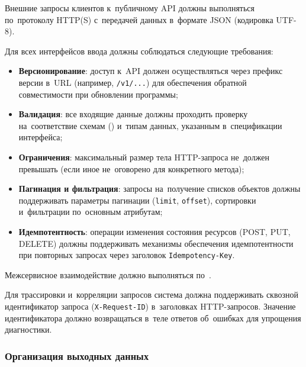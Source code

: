 \documentclass[12pt,a4paper]{extarticle}
\begin{document}
\begin{hseExample}
Внешние запросы клиентов к~публичному API должны выполняться по~протоколу HTTP(S) с~передачей данных в~формате JSON (кодировка UTF-8).

Для всех интерфейсов ввода должны соблюдаться следующие требования:
\begin{itemize}[nosep, leftmargin=1.25cm]
    \item \textbf{Версионирование}: доступ к~API должен осуществляться через префикс версии в~URL (например, \texttt{/v1/...}) для обеспечения обратной совместимости при обновлении программы;
    \item \textbf{Валидация}: все входящие данные должны проходить проверку на~соответствие схемам () и~типам данных, указанным в~спецификации интерфейса;
    \item \textbf{Ограничения}: максимальный размер тела HTTP-запроса не~должен превышать  (если иное не~оговорено для конкретного метода);
    \item \textbf{Пагинация и фильтрация}: запросы на~получение списков объектов должны поддерживать параметры пагинации (\texttt{limit}, \texttt{offset}), сортировки и~фильтрации по~основным атрибутам;
    \item \textbf{Идемпотентность}: операции изменения состояния ресурсов (POST, PUT, DELETE) должны поддерживать механизмы обеспечения идемпотентности при повторных запросах через заголовок \texttt{Idempotency-Key}.
\end{itemize}

Межсервисное взаимодействие должно выполняться по~.

Для трассировки и~корреляции запросов система должна поддерживать сквозной идентификатор запроса (\texttt{X-Request-ID}) в~заголовках HTTP-запросов. Значение идентификатора должно возвращаться в~теле ответов об~ошибках для упрощения диагностики.
\end{hseExample}

\subsubsection{Организация выходных данных}
\label{sec:output_data}
\end{document}
